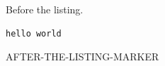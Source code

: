 \documentclass{article}
\begin{document}
Before the listing.
\begin{lstlisting}
hello world \end{lstlisting}
AFTER-THE-LISTING-MARKER
\end{document}
